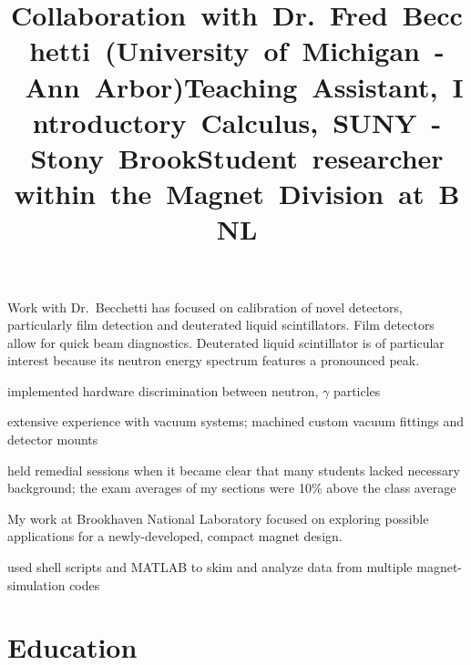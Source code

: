\documentclass[overlapped,line,letterpaper]{res}
\begin{document}
\begin{resume}
\title{\mbox{Collaboration with Dr.\ Fred Becchetti (University of Michigan - Ann Arbor)}}
\begin{position}
  Work with Dr.\ Becchetti has focused on calibration of novel detectors, particularly film detection and deuterated liquid scintillators.  Film detectors allow for quick beam diagnostics.  Deuterated liquid scintillator is of particular interest because its neutron energy spectrum features a pronounced peak.
\begin{itemize}
\renewcommand{\labelitemi}{-}
{\setlength\itemindent{15pt} \item implemented hardware discrimination between neutron, $\gamma$ particles}
{\setlength\itemindent{15pt} \item extensive experience with vacuum systems; machined custom vacuum fittings and detector mounts}
\end{itemize}
\end{position}

\title{\mbox{Teaching Assistant, Introductory Calculus, SUNY - Stony Brook}}
\begin{position}
\begin{itemize}
\vspace{-9mm}
\renewcommand{\labelitemi}{-}
{\setlength\itemindent{15pt} \item held remedial sessions when it became clear that many students lacked necessary background; the exam averages of my sections were 10\% above the class average}
\end{itemize}
\end{position}

\title{\mbox{Student researcher within the Magnet Division at BNL}}
\begin{position}
My work at Brookhaven National Laboratory focused on exploring possible
applications for a newly-developed, compact magnet design.
\begin{itemize}
\renewcommand{\labelitemi}{-}
{\setlength\itemindent{15pt} \item used shell scripts and MATLAB to skim and analyze data from multiple magnet-simulation codes}
\end{itemize}
\end{position}


\section{\bf Education}


\end{resume}
\end{document}
